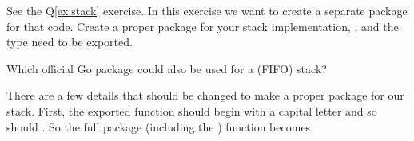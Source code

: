 \begin{Exercise}[title={Stack as package},difficulty=2]
\label{ex:stack-package}
See the Q\ref{ex:stack} exercise. In this exercise we want to create
a separate package for that code.
\Question\label{ex:stack-package q1} Create a proper package for your
stack implementation, ,  and the  type need to be
exported.

\Question\label{ex:stack-package q2} Which official Go package could
also be used for a (FIFO) stack?

\end{Exercise}

\begin{Answer}
\Question There are a few details that should be changed to make a proper package
for our stack. First, the exported function should begin with a capital 
letter and so should . So the full package (including the
) function becomes


\end{Answer}
